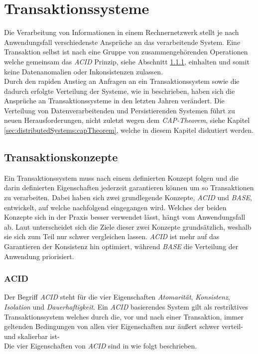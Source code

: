 \chapter{Transaktionssysteme} \label{cha:transactionSystems}
Die Verarbeitung von Informationen in einem Rechnernetzwerk stellt je nach Anwendungsfall verschiedenste Ansprüche an das verarbeitende System. Eine Transaktion selbst ist nach \cite{rahm1993HochleistungsTransaktionssysteme} eine Gruppe von zusammengehörenden Operationen welche gemeinsam das \textit{ACID} Prinzip, siehe Abschnitt \ref{sec:transactionTheory:acid}, einhalten und somit keine Datenanomalien oder Inkonsistenzen zulassen. \\
Durch den rapiden Anstieg an Anfragen an ein Transaktionssystem sowie die dadurch erfolgte Verteilung der Systeme, wie in \cite{li2017research} beschrieben, haben sich die Ansprüche an Transaktionssysteme in den letzten Jahren verändert. Die Verteilung von Datenverarbeitenden und Persistierenden Systemen führt zu neuen Herausforderungen, nicht zuletzt wegen dem \textit{CAP-Theorem}, siehe Kapitel \ref{sec:distributedSystems:capTheorem}, welche in diesem Kapitel diskutiert werden. 

\section{Transaktionskonzepte}
Ein Transaktionssystem muss nach \cite{rahm1993HochleistungsTransaktionssysteme} einem definierten Konzept folgen und die darin definierten Eigenschaften jederzeit garantieren können um so Transaktionen zu verarbeiten. Dabei haben sich zwei grundlegende Konzepte, \textit{ACID} und \textit{BASE}, entwickelt, auf welche nachfolgend eingegangen wird. Welches der beiden Konzepte sich in der Praxis besser verwendet lässt, hängt vom Anwendungsfall ab. Laut \cite{EdlichFriedlandHampeBrauer201010} unterscheidet sich die Ziele dieser zwei Konzepte grundsätzlich, weshalb sie sich zum Teil nur schwer vergleichen lassen. \textit{ACID} ist mehr auf das Garantieren der Konsistenz hin optimiert, während \textit{BASE} die Verteilung der Anwendung priorisiert.

\subsection{ACID}\label{sec:transactionTheory:acid}
Der Begriff \textit{ACID} steht für die vier Eigenschaften \textit{Atomarität}, \textit{Konsistenz}, \textit{Isolation} und \textit{Dauerhaftigkeit}. Ein \textit{ACID} basierendes System gilt als restriktives Transaktionssystem welches durch die, vor und nach einer Transaktion, immer geltenden Bedingungen von allen vier Eigenschaften nur äußert schwer verteil- und skalierbar ist- \cite{PritchettBASE}\\
Die vier Eigenschaften von \textit{ACID} sind in \cite{haerder198Acid} wie folgt beschrieben.

